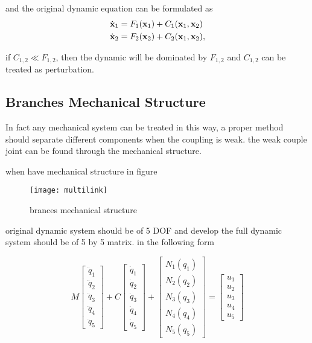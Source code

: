 and  the original dynamic equation can be formulated as
\begin{align}
\dot{\mathbf{x}}_1&=F_1(\mathbf{x}_1)+C_1(\mathbf{x}_1,\mathbf{x}_2)\nonumber\\
\dot{\mathbf{x}}_2&=F_2(\mathbf{x}_2)+C_2(\mathbf{x}_1,\mathbf{x}_2),\nonumber
\end{align}

if $C_{1,2} \ll F_{1,2}$, then the dynamic will be dominated by $F_{1,2}$ and $C_{1,2}$ can be treated as perturbation.
\subsection*{Branches Mechanical Structure}
In fact any mechanical system can be treated in this way,
a proper method should separate different components when the coupling is weak.
the weak couple joint can be found through the mechanical structure.

when have mechanical structure in figure
\begin{figure}[!htbp]
  \begin{center}
      \texttt{[image: multilink]}
    \caption{brances mechanical structure}
    \label{fig:branches structure}
\end{center}
\end{figure}

original dynamic system should be of 5 DOF and develop the full dynamic system should be of 5 by 5 matrix.
in the following form


\[
M\left[\begin{array}{c}
\ddot{q}_{1}\\
\ddot{q}_{2}\\
\ddot{q}_{3}\\
\ddot{q}_{4}\\
\ddot{q}_{5}\end{array}\right]+C\left[\begin{array}{c}
\dot{q}_{1}\\
\dot{q}_{2}\\
\dot{q}_{3}\\
\dot{q}_{4}\\
\dot{q}_{5}\end{array}\right]+\left[\begin{array}{c}
N_{1}(q_{1})\\
N_{2}(q_{2})\\
N_{3}(q_{3})\\
N_{4}(q_{4})\\
N_{5}(q_{5})\end{array}\right]=\left[\begin{array}{c}
u_{1}\\
u_{2}\\
u_{3}\\
u_{4}\\
u_{5}\end{array}\right]
\]

